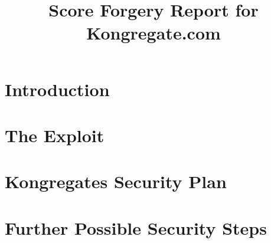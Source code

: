 \documentclass [11pt] {article}
\begin{document}
\title { Score Forgery Report for Kongregate.com}

\maketitle

\section { Introduction }

\section { The Exploit }

\section { Kongregates Security Plan }

\section { Further Possible Security Steps } 
\end{document}
